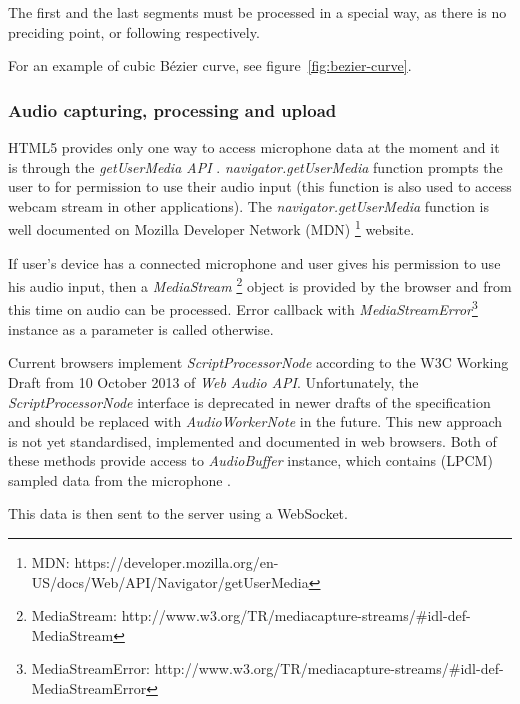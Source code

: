 The first and the last segments must be processed in a special way, as there is no preciding point, or following respectively. 

For an example of cubic Bézier curve, see figure~\ref{fig:bezier-curve}.



\subsubsection{Audio capturing, processing and upload}

HTML5 provides only one way to access microphone data at the moment and it is through the \textit{getUserMedia API} \cite{get_user_media}. \textit{navigator.getUserMedia} function prompts the user to for permission to use their audio input (this function is also used to access webcam stream in other applications). The \textit{navigator.getUserMedia} function is well documented on Mozilla Developer Network (MDN) \footnote{MDN: https://developer.mozilla.org/en-US/docs/Web/API/Navigator/getUserMedia} website.

If user's device has a connected microphone and user gives his permission to use his audio input, then a \textit{MediaStream} \footnote{MediaStream: http://www.w3.org/TR/mediacapture-streams/\#idl-def-MediaStream} object is provided by the browser and from this time on audio can be processed. Error callback with \textit{MediaStreamError}\footnote{MediaStreamError: http://www.w3.org/TR/mediacapture-streams/\#idl-def-MediaStreamError} instance as a parameter is called otherwise.

Current browsers implement \textit{ScriptProcessorNode} according to the W3C Working Draft from 10 October 2013 of \textit{Web Audio API}. Unfortunately, the \textit{ScriptProcessorNode} interface is deprecated in newer drafts of the specification and should be replaced with \textit{AudioWorkerNote} in the future\cite{mic_deprecated}. This new approach is not yet standardised, implemented and documented in web browsers. Both of these methods provide access to \textit{AudioBuffer} instance, which contains  (LPCM)\cite{wiki_pcm} sampled data from the microphone \cite{mic_pcm}.

This data is then sent to the server using a WebSocket. 


